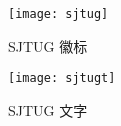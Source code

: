 \documentclass{ctexart}
\begin{document}
  \begin{figure}[ht]
    \begin{minipage}{0.48\textwidth}
      \centering
      \texttt{[image: sjtug]}
      \caption{SJTUG 徽标}\label{fig:sjtug}
    \end{minipage}\hfill
    \begin{minipage}{0.48\textwidth}
      \centering
      \texttt{[image: sjtugt]}
      \caption{SJTUG 文字}\label{fig:sjtugt}
    \end{minipage}
  \end{figure}
\end{document}
